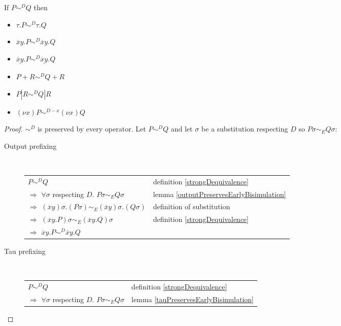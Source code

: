 \begin{lemma}\label{strongDEquivalencePreservedByAllExceptInput}
      If $P \sim^{D} Q$ then 
      \begin{itemize}
	\item 
	  $\tau.P \sim^{D} \tau.Q$
	\item 
	  $\overline{x}y.P \sim^{D} \overline{x}y.Q$
	\item 
	  $\underline{\overline{x}y}.P \sim^{D} \underline{\overline{x}y}.Q$
	\item
	  $P+R \sim^{D} Q+R$
	\item
	  $P|R \sim^{D} Q|R$
	\item
	  $(\nu x)P \sim^{D-x} (\nu x)Q$
      \end{itemize}
  \begin{proof}
    $\sim^{D}$ is preserved by every operator. Let $P \sim^{D} Q$ and let $\sigma$ be a substitution respecting $D$ so $P\sigma \sim_{E} Q\sigma$:
    \begin{description}
      \item[Output prefixing]\hfill \\
	\begin{center}
	  \begin{tabular}{ll}
	      $P \sim^{D} Q$
	    &
	      definition \ref{strongDequivalence}
	  \\
	      $\Rightarrow$ $\forall \sigma$ respecting $D.$ $P\sigma \sim_{E} Q\sigma$
	    &
	      lemma \ref{outputPreservesEarlyBisimulation}
	  \\
	      $\Rightarrow$ $(\overline{x}y)\sigma.(P\sigma) \sim_{E} (\overline{x}y)\sigma.(Q\sigma)$
	    &
	      definition of substitution
	  \\
	      $\Rightarrow$ $(\overline{x}y.P)\sigma \sim_{E} (\overline{x}y.Q)\sigma$
	    &
	      definition \ref{strongDequivalence}
	  \\
	      $\Rightarrow$ $\overline{x}y.P \sim^{D} \overline{x}y.Q$
	    &
	  \end{tabular}
	\end{center}
      \item[Tau prefixing]\hfill \\
	\begin{center}
	  \begin{tabular}{ll}
	      $P \sim^{D} Q$
	    &
	      definition \ref{strongDequivalence}
	  \\
	      $\Rightarrow$ $\forall \sigma$ respecting $D.$ $P\sigma \sim_{E} Q\sigma$
	    &
	      lemma \ref{tauPreservesEarlyBisimulation}

\end{tabular}
\end{center}
\end{description}
\end{proof}
\end{lemma}
